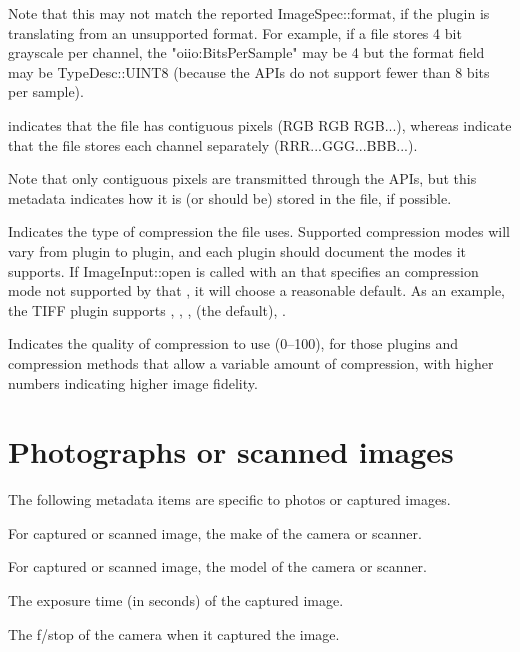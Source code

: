 Note that this may not match the reported {\cf ImageSpec::format}, if
the plugin is translating from an unsupported format.  For example, if a
file stores 4 bit grayscale per channel, the {\cf "oiio:BitsPerSample"} may
be 4 but the {\cf format} field may be {\cf TypeDesc::UINT8} (because
the \product APIs do not support fewer than 8 bits per sample).
\apiend

 indicates that the file has contiguous pixels (RGB RGB
RGB...), whereas  indicate that the file stores each
channel separately (RRR...GGG...BBB...).

Note that only contiguous pixels are transmitted through the \product
APIs, but this metadata indicates how it is (or should be) stored in the
file, if possible.
\apiend

Indicates the type of compression the file uses.  Supported compression
modes will vary from \ImageInput plugin to plugin, and each plugin
should document the modes it supports.  If {\cf ImageInput::open} is
called with an \ImageSpec that specifies an compression mode not
supported by that \ImageInput, it will choose a reasonable default.
As an example, the TIFF \ImageInput plugin supports ,
, ,  (the default), .
\apiend

Indicates the quality of compression to use (0--100), for those 
plugins and compression methods that allow a variable amount of 
compression, with higher numbers indicating higher image fidelity.
\apiend

\section{Photographs or scanned images}

The following metadata items are specific to photos or captured images.

For captured or scanned image, the make of the camera or scanner.
\apiend

For captured or scanned image, the model of the camera or scanner.
\apiend

The exposure time (in seconds) of the captured image.
\apiend

The f/stop of the camera when it captured the image.
\apiend

